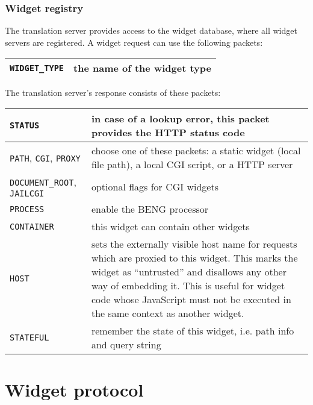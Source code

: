 \documentclass[a4paper,12pt]{article}
\begin{document}
\subsubsection{Widget registry}

The translation server provides access to the widget database, where
all widget servers are registered.  A widget request can use the
following packets:

\begin{tabular}{|l|p{10cm}|}
\hline
\texttt{WIDGET\_TYPE} & the name of the widget type \\
\hline
\end{tabular}

The translation server's response consists of these packets:

\begin{tabular}{|l|p{10cm}|}
\hline
\texttt{STATUS} & in case of a lookup error, this packet provides the
HTTP status code \\
\hline

\texttt{PATH}, \texttt{CGI}, \texttt{PROXY} & choose one of these
packets: a static widget (local file path), a local CGI script, or a
HTTP server \\

\hline

\texttt{DOCUMENT\_ROOT}, \texttt{JAILCGI} & optional flags for CGI
widgets \\

\hline
\texttt{PROCESS} & enable the BENG processor \\
\hline
\texttt{CONTAINER} & this widget can contain other widgets \\

\hline

\texttt{HOST} & sets the externally visible host name for requests
which are proxied to this widget.  This marks the widget as
``untrusted'' and disallows any other way of embedding it.  This is
useful for widget code whose JavaScript must not be executed in the
same context as another widget. \\

\hline

\texttt{STATEFUL} & remember the state of this widget, i.e. path info
and query string \\

\hline
\end{tabular}


\section{Widget protocol}
\end{document}
